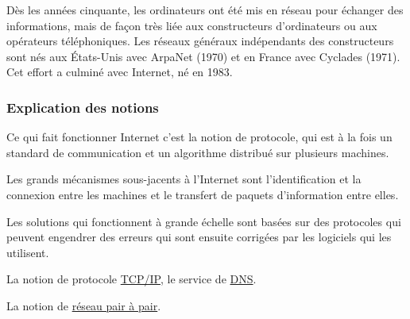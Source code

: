 \begin{tcolorbox}[title={Repères historiques}, toprule=0pt, leftrule=0pt, rightrule=0pt, arc=0pt,
                  fonttitle=\scshape\boxtitlefont,
                  colbacktitle=white, coltitle=firstcolor, colframe=firstcolor, colback=firstcolor!10,
                  breakable, enhanced jigsaw]
Dès les années cinquante, les ordinateurs ont été mis en réseau pour échanger des informations, mais de façon très liée aux constructeurs d’ordinateurs ou aux opérateurs téléphoniques. Les réseaux généraux indépendants des constructeurs sont nés aux États-Unis avec ArpaNet (1970) et en France avec Cyclades (1971). Cet effort a culminé avec Internet, né en 1983.
\end{tcolorbox}


\subsubsection[Explication des notions]{Explication des notions}
\label{subsub:IX.1.1.3}


\begin{jazzitemize}
\item Ce qui fait fonctionner Internet c'est la notion de protocole, qui est à la fois un standard de communication et un algorithme distribué sur plusieurs machines.
\item Les grands mécanismes sous-jacents à l'Internet sont l'identification et la connexion entre les machines et le transfert de paquets d'information entre elles.
\item Les solutions  qui fonctionnent à grande échelle sont basées sur des protocoles qui peuvent engendrer des erreurs qui sont ensuite corrigées par les logiciels qui les utilisent.
\end{jazzitemize}


\begin{jazzitemize}
\item La notion de protocole \href{https://fr.wikipedia.org/wiki/Suite_des_protocoles_Internet}{TCP/IP}, le service de \href{https://fr.wikipedia.org/wiki/Domain_Name_System}{DNS}.
\item La notion de \href{https://fr.wikipedia.org/wiki/Pair-%C3%A0-pair}{réseau pair à pair}.
\end{jazzitemize}

